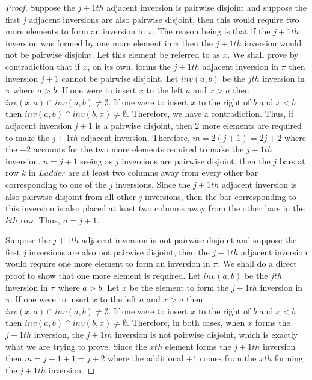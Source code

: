 \begin{proof}
    Suppose the $j+1th$ adjacent inversion is pairwise disjoint and suppose the first $j$ adjacent inversions are also 
    pairwise disjoint, then this would require two more elements to form an 
    inversion in $\pi$. The reason being is that if the $j+1th$ inversion was formed by one more element in $\pi$ then 
    the $j+1th$ inversion would not be pairwise disjoint. Let this element be referred to as $x$. We shall prove by contradiction 
    that if $x$, on its own, forms the $j+1th$ adjacent inversion in $\pi$ then inversion $j+1$ cannot be pairwise disjoint. Let $inv(a,b)$ 
    be the $jth$ inversion in $\pi$ where $a>b$. If one were to insert $x$
    to the left $a$ and $x>a$ then $inv(x,a) \cap inv(a,b) \neq \emptyset$. If one were to insert $x$ to the right of $b$ and 
    $x<b$ then $inv(a,b) \cap inv(b,x) \neq \emptyset$. Therefore, we have a contradiction. Thus, if adjacent inversion $j+1$ 
    is a pairwise disjoint, then $2$ more 
    elements are required to make the $j+1th$ adjacent inversion. Therefore, $m=2(j+1)=2j+2$ where the $+2$ accounts for the 
    two more elements required to make the $j+1th$ inversion. $n=j+1$ seeing as $j$ inversions are pairwise disjoint, then the $j$ bars 
    at row $k$ in $Ladder$ are at least two columns away from every other bar corresponding 
    to one of the $j$ inversions. Since the $j+1th$ adjacent inversion is also pairwise disjoint from all other $j$ inversions, 
    then the bar corresponding to this inversion is 
    also placed at least two columns away from the other bars in the $kth$ row. Thus, $n=j+1$.\par 


    Suppose the $j+1th$ adjacent inversion is not pairwise disjoint and suppose the first $j$ inversions 
    are also not pairwise disjoint, then the $j+1th$ adjacent inversion would require one more element to form an inversion 
    in $\pi$. We shall do a direct proof to show that one more element is required. Let $inv(a,b)$ be the $jth$ inversion 
    in $\pi$ where $a>b$. Let $x$ be the element to form the $j+1th$ inversion in $\pi$. If one were to insert $x$
    to the left $a$ and $x>a$ then $inv(x,a) \cap inv(a,b) \neq \emptyset$.  If one were to insert $x$ to the right of $b$ and 
    $x<b$ then $inv(a,b) \cap inv(b,x) \neq \emptyset$. Therefore, in both cases, when $x$ forms the $j+1th$ inversion, 
    the $j+1th$ inversion is not pairwise disjoint, which is exactly what we are trying to prove. Since the $xth$ element 
    forms the $j+1th$ inversion then $m=j+1+1=j+2$ where the additional $+1$ comes from the $xth$ forming the $j+1th$ inversion.\par 


\end{proof}
